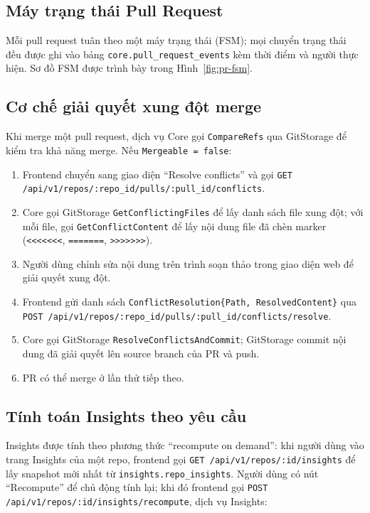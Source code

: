 \subsection{Máy trạng thái Pull Request}
Mỗi pull request tuân theo một máy trạng thái (FSM); mọi chuyển trạng thái đều được ghi vào bảng \texttt{core.pull\_request\_events} kèm thời điểm và người thực hiện. Sơ đồ FSM được trình bày trong Hình~\ref{fig:pr-fsm}.



\subsection{Cơ chế giải quyết xung đột merge}
Khi merge một pull request, dịch vụ Core gọi \texttt{CompareRefs} qua GitStorage để kiểm tra khả năng merge. Nếu \texttt{Mergeable = false}:

\begin{enumerate}
\item Frontend chuyển sang giao diện ``Resolve conflicts'' và gọi \texttt{GET /api/v1/repos/:repo\_id/pulls/:pull\_id/conflicts}.
\item Core gọi GitStorage \texttt{GetConflictingFiles} để lấy danh sách file xung đột; với mỗi file, gọi \texttt{GetConflictContent} để lấy nội dung file đã chèn marker (\texttt{<<<<<<<}, \texttt{=======}, \texttt{>>>>>>>}).
\item Người dùng chỉnh sửa nội dung trên trình soạn thảo trong giao diện web để giải quyết xung đột.
\item Frontend gửi danh sách \texttt{ConflictResolution\{Path, ResolvedContent\}} qua \texttt{POST /api/v1/repos/:repo\_id/pulls/:pull\_id/conflicts/resolve}.
\item Core gọi GitStorage \texttt{ResolveConflictsAndCommit}; GitStorage commit nội dung đã giải quyết lên source branch của PR và push.
\item PR có thể merge ở lần thử tiếp theo.
\end{enumerate}

\subsection{Tính toán Insights theo yêu cầu}
Insights được tính theo phương thức ``recompute on demand'': khi người dùng vào trang Insights của một repo, frontend gọi \texttt{GET /api/v1/repos/:id/insights} để lấy snapshot mới nhất từ \texttt{insights.repo\_insights}. Người dùng có nút ``Recompute'' để chủ động tính lại; khi đó frontend gọi \texttt{POST /api/v1/repos/:id/insights/recompute}, dịch vụ Insights:

